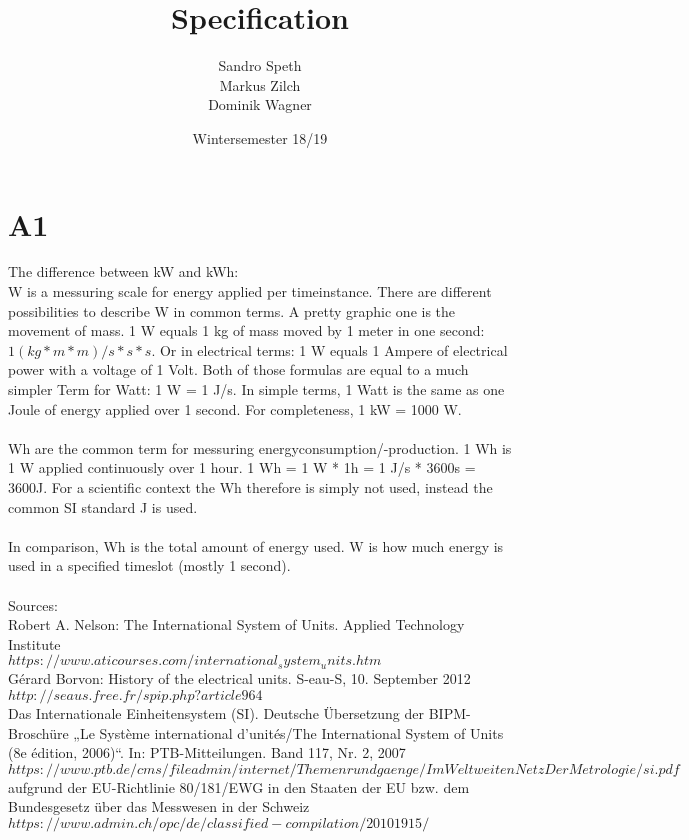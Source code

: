 \documentclass[12pt]{scrartcl}
\title{Specification}
\date{Wintersemester 18/19}
\author{Sandro Speth\\
Markus Zilch\\
Dominik Wagner}
\begin{document}
\maketitle

\section*{A1}
The difference between kW and kWh:\\
W is a messuring scale for energy applied per timeinstance.
There are different possibilities to describe W in common terms.
A pretty graphic one is the movement of mass.
1 W equals 1 kg of mass moved by 1 meter in one second: $1 (kg*m*m)/s*s*s$.
Or in electrical terms: 1 W equals 1 Ampere of electrical power with a voltage of 1 Volt.
Both of those formulas are equal to a much simpler Term for Watt: 1 W = 1 J/s.
In simple terms, 1 Watt is the same as one Joule of energy applied over 1 second.
For completeness, 1 kW = 1000 W.\\
\\
Wh are the common term for messuring energyconsumption/-production.
1 Wh is 1 W applied continuously over 1 hour.
 1 Wh = 1 W * 1h = 1 J/s * 3600s = 3600J.
 For a scientific context the Wh therefore is simply not used, instead the common SI standard J is used.\\
\\
In comparison, Wh is the total amount of energy used. W is how much energy is used in a specified timeslot (mostly 1 second).\\
\\
Sources:\\
Robert A. Nelson: The International System of Units. Applied Technology Institute\\
$https://www.aticourses.com/international_system_units.htm$\\
Gérard Borvon: History of the electrical units. S-eau-S, 10. September 2012\\
$http://seaus.free.fr/spip.php?article964$\\
Das Internationale Einheitensystem (SI). Deutsche Übersetzung der BIPM-Broschüre „Le Système international d’unités/The International System of Units (8e édition, 2006)“. In: PTB-Mitteilungen. Band 117, Nr. 2, 2007\\
$https://www.ptb.de/cms/fileadmin/internet/Themenrundgaenge/ImWeltweitenNetzDerMetrologie/si.pdf$\\
aufgrund der EU-Richtlinie 80/181/EWG in den Staaten der EU bzw. dem Bundesgesetz über das Messwesen in der Schweiz\\
$https://www.admin.ch/opc/de/classified-compilation/20101915/$
\end{document}
